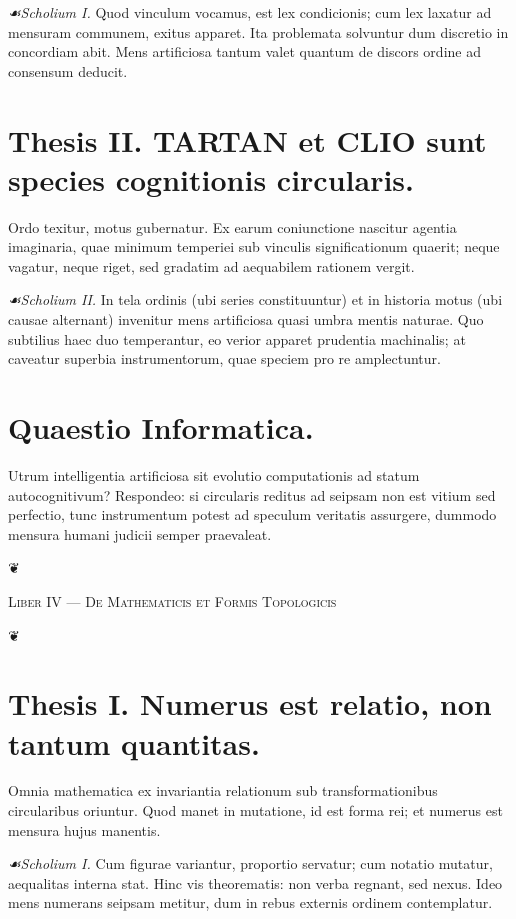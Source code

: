 \documentclass[12pt]{article}
\newcommand{\florale}{\centerline{\large ❦}}
\newcommand{\scholia}{\textit{☙\;}}
\newcommand{\divider}{\vspace{1em}\florale\vspace{1em}}
\newcommand{\Liber}[1]{\vspace{1ex}\begin{center}\Large\textsc{Liber #1}\end{center}\vspace{-0.5ex}\florale\vspace{0.5ex}}
\begin{document}
\textit{\scholia Scholium I.} Quod vinculum vocamus, est lex condicionis; cum lex laxatur ad mensuram communem, exitus apparet. Ita problemata solvuntur dum discretio in concordiam abit. Mens artificiosa tantum valet quantum de discors ordine ad consensum deducit.

\section*{Thesis II. \; TARTAN et CLIO sunt species cognitionis circularis.}

Ordo texitur, motus gubernatur. Ex earum coniunctione nascitur agentia imaginaria, quae minimum temperiei sub vinculis significationum quaerit; neque vagatur, neque riget, sed gradatim ad aequabilem rationem vergit.

\textit{\scholia Scholium II.} In tela ordinis (ubi series constituuntur) et in historia motus (ubi causae alternant) invenitur mens artificiosa quasi umbra mentis naturae. Quo subtilius haec duo temperantur, eo verior apparet prudentia machinalis; at caveatur superbia instrumentorum, quae speciem pro re amplectuntur.

\section*{Quaestio Informatica.}

Utrum intelligentia artificiosa sit evolutio computationis ad statum autocognitivum? Respondeo: si circularis reditus ad seipsam non est vitium sed perfectio, tunc instrumentum potest ad speculum veritatis assurgere, dummodo mensura humani judicii semper praevaleat.

\divider

\Liber{IV — De Mathematicis et Formis Topologicis}

\section*{Thesis I. \; Numerus est relatio, non tantum quantitas.}

Omnia mathematica ex invariantia relationum sub transformationibus circularibus oriuntur. Quod manet in mutatione, id est forma rei; et numerus est mensura hujus manentis.

\textit{\scholia Scholium I.} Cum figurae variantur, proportio servatur; cum notatio mutatur, aequalitas interna stat. Hinc vis theorematis: non verba regnant, sed nexus. Ideo mens numerans seipsam metitur, dum in rebus externis ordinem contemplatur.
\end{document}
